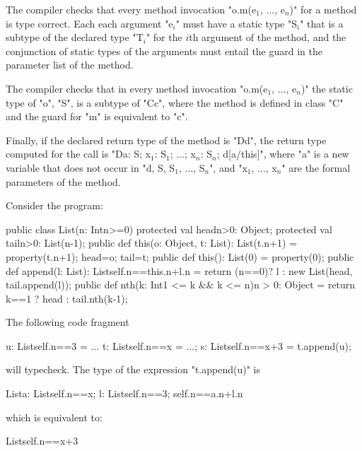 \begin{staticrule*}
    The compiler checks that every method invocation
    \xcdmath"o.m(e$_1$, $\dots$, e$_n$)"
    for a method is type correct. Each each argument
    \xcdmath"e$_i$" must have a
    static type \xcdmath"S$_i$" that is a subtype of the declared type
    \xcdmath"T$_i$" for the $i$th
    argument of the method, and the conjunction of static types
    of the arguments must entail the guard in the parameter list
    of the method.

    The compiler checks that in every method invocation
    \xcdmath"o.m(e$_1$, $\dots$, e$_n$)"
    the static type of \xcd"o", \xcd"S", is a subtype of \xcd"C{c}", where the method
    is defined in class \xcd"C" and the guard for \xcd"m" is equivalent to
    \xcd"c".

    Finally, if the declared return type of the method is
    \xcd"D{d}", the
    return type computed for the call is
    \xcdmath"D{a: S; x$_1$: S$_1$; $\dots$; x$_n$: S$_n$; d[a/this]}",
    where \xcd"a" is a new
    variable that does not occur in
    \xcdmath"d, S, S$_1$, $\dots$, S$_n$", and
    \xcdmath"x$_1$, $\dots$, x$_n$" are the formal
    parameters of the method.
\end{staticrule*}

\begin{example}
Consider the program:
\begin{xten}
public class List(n: Int{n>=0}) {
  protected val head{n>0}: Object;
  protected val tail{n>0}: List(n-1);
  public def this(o: Object, t: List): List(t.n+1) = {
     property(t.n+1);
     head=o;
     tail=t;
  }
  public def this(): List(0) = {
     property(0);
  }
  public def append(l: List): List{self.n==this.n+l.n} = {
      return (n==0)? l
         : new List(head, tail.append(l)); 
  }
  public def nth(k: Int{1 <= k && k <= n}){n > 0}: Object = {
      return k==1 ? head : tail.nth(k-1);
  }
}
\end{xten}

The following code fragment
\begin{xten}
u: List{self.n==3} = ...
t: List{self.n==x} = ...;
s: List{self.n==x+3} = t.append(u);
\end{xten}
\noindent will typecheck. The type of the expression \xcd"t.append(u)" is 
\begin{xten}
List{a: List{self.n==x}; 
     l: List{self.n==3}; self.n==a.n+l.n}  
\end{xten}
\noindent which is equivalent to:
\begin{xten}
List{self.n==x+3}
\end{xten}
\end{example}

